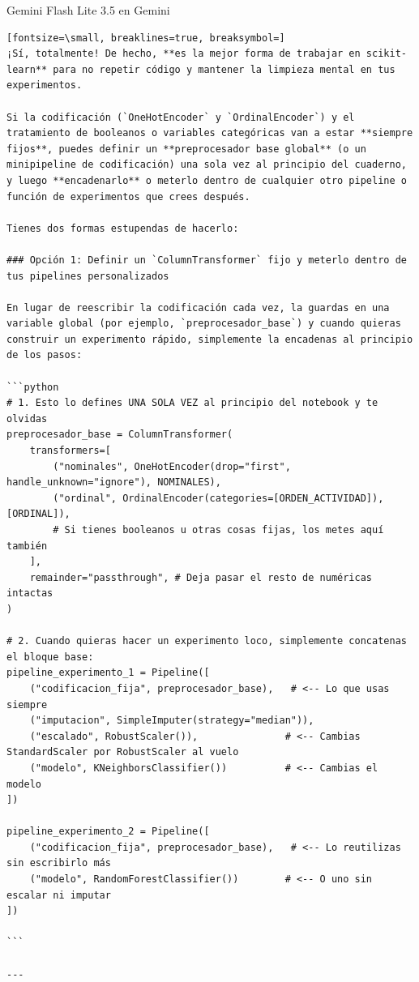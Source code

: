 \documentclass[12pt,a4paper,oneside]{book}
\begin{document}
\begin{iaresp}{Gemini Flash Lite 3.5 en Gemini}
\begin{Verbatim}[fontsize=\small, breaklines=true, breaksymbol=]
¡Sí, totalmente! De hecho, **es la mejor forma de trabajar en scikit-learn** para no repetir código y mantener la limpieza mental en tus experimentos.

Si la codificación (`OneHotEncoder` y `OrdinalEncoder`) y el tratamiento de booleanos o variables categóricas van a estar **siempre fijos**, puedes definir un **preprocesador base global** (o un minipipeline de codificación) una sola vez al principio del cuaderno, y luego **encadenarlo** o meterlo dentro de cualquier otro pipeline o función de experimentos que crees después.

Tienes dos formas estupendas de hacerlo:

### Opción 1: Definir un `ColumnTransformer` fijo y meterlo dentro de tus pipelines personalizados

En lugar de reescribir la codificación cada vez, la guardas en una variable global (por ejemplo, `preprocesador_base`) y cuando quieras construir un experimento rápido, simplemente la encadenas al principio de los pasos:

```python
# 1. Esto lo defines UNA SOLA VEZ al principio del notebook y te olvidas
preprocesador_base = ColumnTransformer(
    transformers=[
        ("nominales", OneHotEncoder(drop="first", handle_unknown="ignore"), NOMINALES),
        ("ordinal", OrdinalEncoder(categories=[ORDEN_ACTIVIDAD]), [ORDINAL]),
        # Si tienes booleanos u otras cosas fijas, los metes aquí también
    ],
    remainder="passthrough", # Deja pasar el resto de numéricas intactas
)

# 2. Cuando quieras hacer un experimento loco, simplemente concatenas el bloque base:
pipeline_experimento_1 = Pipeline([
    ("codificacion_fija", preprocesador_base),   # <-- Lo que usas siempre
    ("imputacion", SimpleImputer(strategy="median")),
    ("escalado", RobustScaler()),               # <-- Cambias StandardScaler por RobustScaler al vuelo
    ("modelo", KNeighborsClassifier())          # <-- Cambias el modelo
])

pipeline_experimento_2 = Pipeline([
    ("codificacion_fija", preprocesador_base),   # <-- Lo reutilizas sin escribirlo más
    ("modelo", RandomForestClassifier())        # <-- O uno sin escalar ni imputar
])

```

---


\end{Verbatim}
\end{iaresp}
\end{document}
